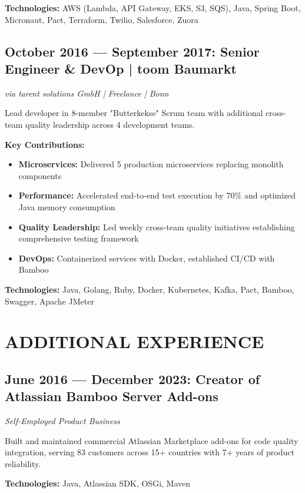 \documentclass[10pt,a4paper]{article}
\begin{document}
\textbf{Technologies:} AWS (Lambda, API Gateway, EKS, S3, SQS), Java, Spring Boot, Micronaut, Pact, Terraform, Twilio, Salesforce, Zuora

\vspace{6pt}

\subsection{October 2016 — September 2017: Senior Engineer \& DevOp | toom Baumarkt}
\textit{via tarent solutions GmbH | Freelance | Bonn}

Lead developer in 8-member "Butterkekse" Scrum team with additional cross-team quality leadership across 4 development teams.

\textbf{Key Contributions:}
\begin{itemize}
    \item \textbf{Microservices:} Delivered 5 production microservices replacing monolith components
    \item \textbf{Performance:} Accelerated end-to-end test execution by 70\% and optimized Java memory consumption
    \item \textbf{Quality Leadership:} Led weekly cross-team quality initiatives establishing comprehensive testing framework
    \item \textbf{DevOps:} Containerized services with Docker, established CI/CD with Bamboo
\end{itemize}

\textbf{Technologies:} Java, Golang, Ruby, Docker, Kubernetes, Kafka, Pact, Bamboo, Swagger, Apache JMeter

\newpage

\section{ADDITIONAL EXPERIENCE}

\subsection{June 2016 — December 2023: Creator of Atlassian Bamboo Server Add-ons}
\textit{Self-Employed Product Business}

Built and maintained commercial Atlassian Marketplace add-ons for code quality integration, serving 83 customers across 15+ countries with 7+ years of product reliability.

\textbf{Technologies:} Java, Atlassian SDK, OSGi, Maven
\end{document}
